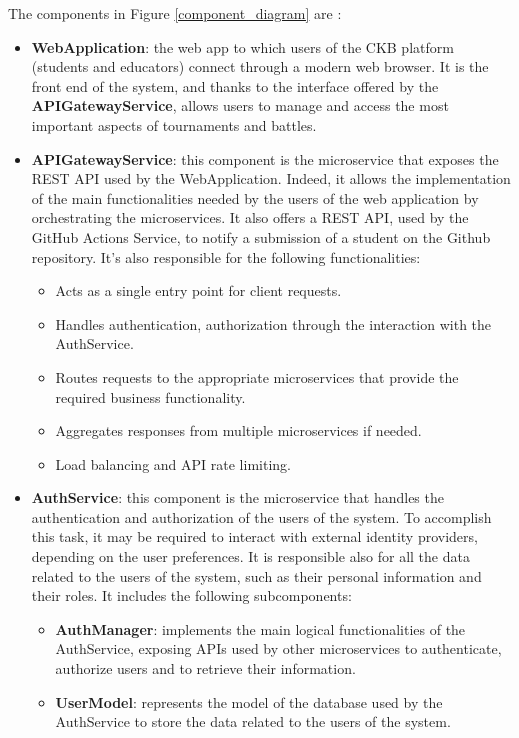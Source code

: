 \newpage
The components in Figure \ref{component_diagram} are :
\begin{itemize}
    \item \textbf{WebApplication}: the web app to which users of the CKB platform (students and educators) connect through a modern web browser. It is the front end of the system, and thanks to the interface offered by the \textbf{APIGatewayService}, allows users to manage and access the most important aspects of tournaments and battles.
    \item \textbf{APIGatewayService}: this component is the microservice that exposes the REST API used by the WebApplication. Indeed, it allows the implementation of the main functionalities needed by the users of the web application by orchestrating the microservices. It also offers a REST API, used by the GitHub Actions Service, to notify a submission of a student on the Github repository.
    It's also responsible for the following functionalities:
    \begin{itemize}
        \item Acts as a single entry point for client requests.
        \item Handles authentication, authorization through the interaction with the AuthService.
        \item Routes requests to the appropriate microservices that provide the required business functionality.
        \item Aggregates responses from multiple microservices if needed.
        \item Load balancing and API rate limiting.
    \end{itemize}
    \item \textbf{AuthService}: this component is the microservice that handles the authentication and authorization of the users of the system. To accomplish this task, it may be required to interact with external identity providers, depending on the user preferences. 
    It is responsible also for all the data related to the users of the system, such as their personal information and their roles. It includes the following subcomponents:
    \begin{itemize}
        \item \textbf{AuthManager}: implements the main logical functionalities of the AuthService, exposing APIs used by other microservices to authenticate, authorize users and to retrieve their information.
        \item \textbf{UserModel}: represents the model of the database used by the AuthService to store the data related to the users of the system.

\end{itemize}
\end{itemize}
